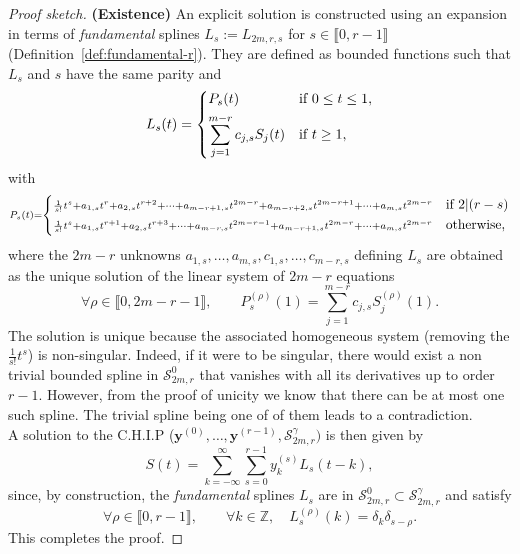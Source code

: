 \begin{proof}[Proof sketch]
  \textbf{(Existence)} An explicit solution is constructed using an expansion in terms of \emph{fundamental} splines 
  ${L_s := L_{2m,r,s}}$ for $s \in \llbracket0,r-1\rrbracket$ (Definition~\ref{def:fundamental-r}). They are defined as 
  bounded functions such that $L_s$ and $s$ have the same parity and
  \begin{equation*}
    L_s(t) = \begin{dcases} P_s(t) & \text{if} \ 0 \leq t \leq 1, \\
    \sum_{j=1}^{m-r} c_{j,s} S_j(t) & \text{if} \ t \geq 1, \end{dcases}
  \end{equation*}
  with
  \begin{equation*}\scriptstyle
    P_s(t) = \begin{dcases}\scriptstyle \frac{1}{s!}t^s + a_{1,s}t^r + a_{2,s}t^{r+2} + \cdots + a_{m-r+1,s}t^{2m-r} + 
      a_{m-r+2,s} t^{2m-r+1} + \cdots + a_{m,s} t^{2m-r} & \text{if $2|(r-s)$} \\
      \scriptstyle\frac{1}{s!}t^s + a_{1,s}t^{r+1} + a_{2,s}t^{r+3} + \cdots + a_{m-r,s}t^{2m-r-1} + a_{m-r+1,s} 
      t^{2m-r} + \cdots + a_{m,s} t^{2m-r} & \text{otherwise},
   \end{dcases}
  \end{equation*}
  where the $2m-r$ unknowns $a_{1,s}, \ldots, a_{m,s}, c_{1,s}, \ldots, c_{m-r,s}$ defining $L_s$ are obtained as the 
  unique solution of the linear system of $2m-r$ equations
  \begin{equation*}
    \forall \rho \in \llbracket0,2m-r-1\rrbracket, \qquad P_s^{(\rho)}(1) =\sum_{j=1}^{m-r} c_{j,s} S_j^{(\rho)}(1).
  \end{equation*}
  The solution is unique because the associated homogeneous system (removing the $\frac{1}{s!}t^s$) is non-singular.  
  Indeed, if it were to be singular, there would exist a non trivial bounded spline in $\mathscr{S}_{2m,r}^{0}$
  that vanishes with all its derivatives up to order $r-1$. However, from the proof of unicity we know that there can be 
  at most one such spline. The trivial spline being one of of them leads to a contradiction.\\

  A solution to the C.H.I.P ($\bm{y}^{(0)}, \ldots, \bm{y}^{(r-1)}, \mathscr{S}_{2m,r}^{\gamma})$ is then given by
  \begin{equation*}
    S(t) = \sum_{k=-\infty}^{\infty} \sum_{s=0}^{r-1} y_k^{(s)} L_s(t-k),
  \end{equation*}
  since, by construction, the \emph{fundamental} splines $L_s$ are in $\mathscr{S}_{2m,r}^0 \subset 
  \mathscr{S}_{2m,r}^{\gamma}$ and satisfy
  \begin{equation}\label{eq:fund-prop}
    \forall \rho \in \llbracket0,r-1\rrbracket, \qquad \forall k \in \mathbb{Z}, \quad L_s^{(\rho)}(k) = 
    \delta_{k}\delta_{s-\rho}.
  \end{equation}
  This completes the proof.
\end{proof}

